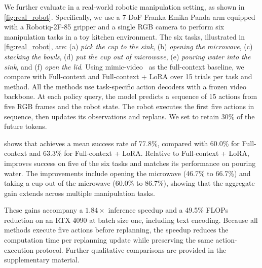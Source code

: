 We further evaluate \method in a real-world robotic manipulation setting, as shown in \cref{fig:real_robot}. Specifically, we use a 7-DoF Franka Emika Panda arm equipped with a Robotiq-2F-85 gripper and a single RGB camera to perform six manipulation tasks in a toy kitchen environment. The six tasks, illustrated in \cref{fig:real_robot}, are: (a) \textit{pick the cup to the sink}, (b) \textit{opening the microwave}, (c) \textit{stacking the bowls}, (d) \textit{put the cup out of microwave}, (e) \textit{pouring water into the sink}, and (f) \textit{open the lid}.
Using mimic-video~\cite{pai2025mimicvideo} as the full-context baseline, we compare \method with Full-context and Full-context + LoRA over 15 trials per task and method.
All the methods use task-specific action decoders with a frozen video backbone.
At each policy query, the model predicts a sequence of
15 actions from five RGB frames and the robot state.
The robot executes the first five actions in sequence,
then updates its observations and replans.
We set \method to retain 30\% of the future tokens.

 shows that \method achieves a mean
success rate of 77.8\%, compared with 60.0\% for Full-context
and 63.3\% for Full-context + LoRA.
Relative to Full-context + LoRA, \method improves success
on five of the six tasks and matches its performance on
pouring water.
The improvements include opening the microwave
(46.7\% to 66.7\%) and taking a cup out of the microwave
(60.0\% to 86.7\%), showing that the aggregate gain extends
across multiple manipulation tasks.

These gains accompany a $1.84\times$ inference speedup
and a 49.5\% FLOPs reduction on an RTX 4090 at batch size one,
including text encoding.
Because all methods execute five actions before replanning,
the speedup reduces the computation time per replanning
update while preserving the same action-execution protocol.
Further qualitative comparisons are provided in the supplementary material.